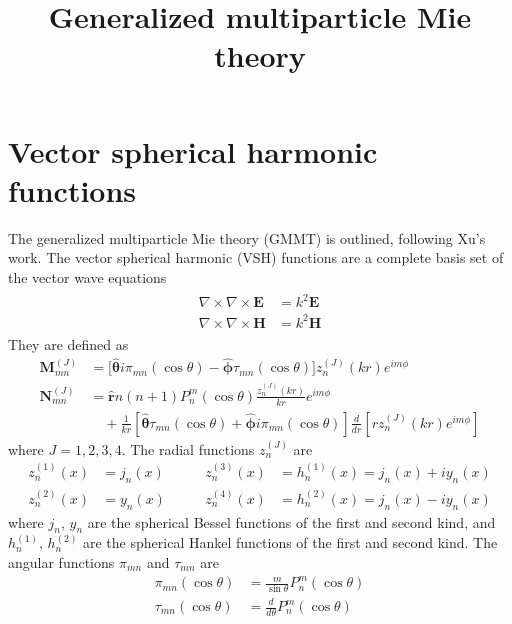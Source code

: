 \documentclass[11pt]{article}
\title{Generalized multiparticle Mie theory}
\date{}
\author{}
\begin{document}
\maketitle

\section{Vector spherical harmonic functions}

The generalized multiparticle Mie theory (GMMT) is outlined, following Xu's work. \cite{xu1995electromagnetic}
The vector spherical harmonic (VSH) functions are a complete basis set of the vector wave equations
\begin{align}
    \begin{split}
        \nabla \times \nabla \times \boldsymbol{E} &= k^2 \boldsymbol{E} \\
        \nabla \times \nabla \times \boldsymbol{H} &= k^2 \boldsymbol{H}
    \end{split}
\end{align}
They are defined as
\begin{align}
    \boldsymbol{M}_{mn}^{(J)} &= \big[
    \boldsymbol{\hat \theta} i\pi_{mn}(\cos\theta) 
   -\boldsymbol{\hat \phi} \tau_{mn}(\cos\theta) \big] z_n^{(J)}(kr) e^{im\phi} \\
    \boldsymbol{N}_{mn}^{(J)} &= 
    \boldsymbol{\hat r} n(n+1) P_n^m(\cos\theta) \frac{z_n^{(J)}(kr)}{kr}e^{im\phi} \\
    &\quad + \frac{1}{kr} \left[ \boldsymbol{\hat \theta} \tau_{mn}(\cos\theta) + \boldsymbol{\hat \phi} i\pi_{mn}(\cos\theta) \right]
    \frac{d}{dr} \left[ rz_n^{(J)}(kr)e^{im\phi} \right] \nonumber
\end{align}
where $J= 1,2,3,4$. The radial functions $z_n^{(J)}$ are
\begin{equation}
\begin{align*}
    z_n^{(1)}(x) &= j_n(x)  \qquad&  z_n^{(3)}(x) &= h_n^{(1)}(x) = j_n(x) + iy_n(x)   \\
z_n^{(2)}(x) &= y_n(x)  \qquad&  z_n^{(4)}(x) &= h_n^{(2)}(x) = j_n(x) - iy_n(x)
\end{align*}
\end{equation}
where $j_n$, $y_n$ are the spherical Bessel functions of the first and second kind, and $h_n^{(1)}$, $h_n^{(2)}$ are the spherical Hankel functions of the first and second kind.
The angular functions $\pi_{mn}$ and $\tau_{mn}$ are
\begin{align}
\pi_{mn}(\cos\theta) &= \frac{m}{\sin\theta} P_n^m(\cos\theta) \\
\tau_{mn}(\cos\theta) &= \frac{d}{d\theta} P_n^m(\cos\theta) 
\end{align}
\end{document}
